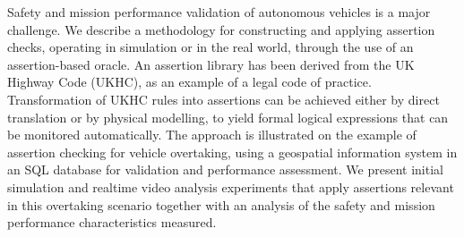 Safety and mission performance validation of autonomous vehicles is a major challenge. We describe a methodology for constructing and applying assertion checks, operating in simulation or in the real world, through the use of an assertion-based oracle. 
%
An assertion library has been derived from the UK Highway Code (UKHC), as an example of a legal code of practice. 
%
Transformation of UKHC rules into assertions can be achieved either by direct translation or by physical modelling, to yield formal logical expressions that can be monitored automatically.
%
The approach is illustrated on the example of assertion checking for vehicle overtaking, using a geospatial information system in an SQL database for validation and performance assessment.
%
We present initial simulation and realtime video analysis experiments that apply assertions relevant in this overtaking scenario together with an analysis of the safety and mission performance characteristics measured.
%

